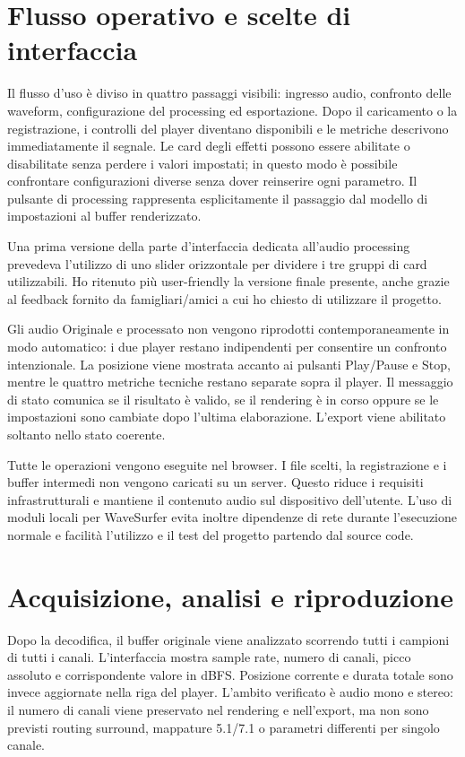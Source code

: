 \documentclass[11pt,a4paper]{article}
\begin{document}
	\section{Flusso operativo e scelte di interfaccia}
	
	Il flusso d'uso è diviso in quattro passaggi visibili: ingresso audio, confronto delle waveform, configurazione del processing ed esportazione. Dopo il caricamento o la registrazione, i controlli del player diventano disponibili e le metriche descrivono immediatamente il segnale. Le card degli effetti possono essere abilitate o disabilitate senza perdere i valori impostati; in questo modo è possibile confrontare configurazioni diverse senza dover reinserire ogni parametro. Il pulsante di processing rappresenta esplicitamente il passaggio dal modello di impostazioni al buffer renderizzato.
	
	Una prima versione della parte d'interfaccia dedicata all'audio processing prevedeva l'utilizzo di uno slider orizzontale per dividere i tre gruppi di card utilizzabili.
	Ho ritenuto più user-friendly la versione finale presente, anche grazie al feedback fornito da famigliari/amici a cui ho chiesto di utilizzare il progetto.
	
	Gli audio Originale e processato non vengono riprodotti contemporaneamente in modo automatico: i due player restano indipendenti per consentire un confronto intenzionale. La posizione viene mostrata accanto ai pulsanti Play/Pause e Stop, mentre le quattro metriche tecniche restano separate sopra il player. Il messaggio di stato comunica se il risultato è valido, se il rendering è in corso oppure se le impostazioni sono cambiate dopo l'ultima elaborazione. L'export viene abilitato soltanto nello stato coerente.
	
	Tutte le operazioni vengono eseguite nel browser. I file scelti, la registrazione e i buffer intermedi non vengono caricati su un server. Questo riduce i requisiti infrastrutturali e mantiene il contenuto audio sul dispositivo dell'utente. L'uso di moduli locali per WaveSurfer evita inoltre dipendenze di rete durante l'esecuzione normale e facilità l'utilizzo e il test del progetto partendo dal source code.
	
	\section{Acquisizione, analisi e riproduzione}
	
	Dopo la decodifica, il buffer originale viene analizzato scorrendo tutti i campioni di tutti i canali. L'interfaccia mostra sample rate, numero di canali, picco assoluto e corrispondente valore in dBFS. Posizione corrente e durata totale sono invece aggiornate nella riga del player. L'ambito verificato è audio mono e stereo: il numero di canali viene preservato nel rendering e nell'export, ma non sono previsti routing surround, mappature 5.1/7.1 o parametri differenti per singolo canale.
	
\end{document}
